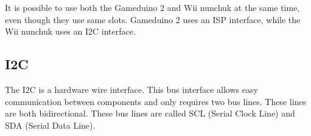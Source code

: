 It is possible to use both the Gameduino 2 and Wii
nunchuk at the same time, even though they use same slots.
Gameduino 2 uses an ISP interface, while the Wii nunchuk uses an I2C interface.


\subsection*{I2C}
The I2C is a hardware wire interface. This bus interface allows easy communication between components and only requires two bus lines. These lines are both bidirectional. These bus lines are called SCL (Serial Clock Line) and SDA (Serial Data Line).
